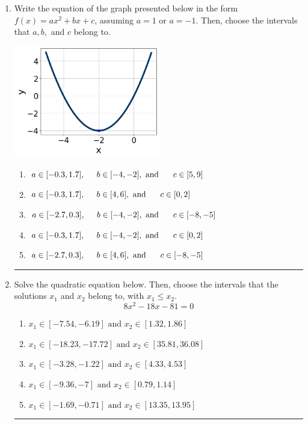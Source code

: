 \documentclass[14pt]{extbook}
\newcommand{\litem}[1]{\item#1\hspace*{-1cm}\rule{\textwidth}{0.4pt}}
\begin{document}
\begin{enumerate}
\litem{
Write the equation of the graph presented below in the form $f(x)=ax^2+bx+c$, assuming  $a=1$ or $a=-1$. Then, choose the intervals that $a, b,$ and $c$ belong to.
\begin{center}
    \includegraphics[width=0.5\textwidth]{../Figures/quadraticGraphToEquationCopyC.png}
\end{center}
\begin{enumerate}[label=\Alph*.]
\item \( a \in [-0.3, 1.7], \hspace*{5mm} b \in [-4, -2], \text{ and } \hspace*{5mm} c \in [5, 9] \)
\item \( a \in [-0.3, 1.7], \hspace*{5mm} b \in [4, 6], \text{ and } \hspace*{5mm} c \in [0, 2] \)
\item \( a \in [-2.7, 0.3], \hspace*{5mm} b \in [-4, -2], \text{ and } \hspace*{5mm} c \in [-8, -5] \)
\item \( a \in [-0.3, 1.7], \hspace*{5mm} b \in [-4, -2], \text{ and } \hspace*{5mm} c \in [0, 2] \)
\item \( a \in [-2.7, 0.3], \hspace*{5mm} b \in [4, 6], \text{ and } \hspace*{5mm} c \in [-8, -5] \)

\end{enumerate} }
\litem{
Solve the quadratic equation below. Then, choose the intervals that the solutions $x_1$ and $x_2$ belong to, with $x_1 \leq x_2$.\[ 8x^{2} -18 x -81 = 0 \]\begin{enumerate}[label=\Alph*.]
\item \( x_1 \in [-7.54, -6.19] \text{ and } x_2 \in [1.32, 1.86] \)
\item \( x_1 \in [-18.23, -17.72] \text{ and } x_2 \in [35.81, 36.08] \)
\item \( x_1 \in [-3.28, -1.22] \text{ and } x_2 \in [4.33, 4.53] \)
\item \( x_1 \in [-9.36, -7] \text{ and } x_2 \in [0.79, 1.14] \)
\item \( x_1 \in [-1.69, -0.71] \text{ and } x_2 \in [13.35, 13.95] \)


\end{enumerate}}
\end{enumerate}
\end{document}

